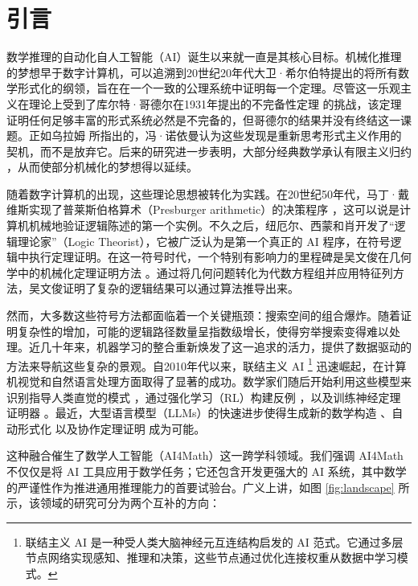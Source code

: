 \documentclass[11pt]{article}
\numberwithin{equation}{section}
\begin{document}
\section{引言}

数学推理的自动化自人工智能（AI）诞生以来就一直是其核心目标。机械化推理的梦想早于数字计算机，可以追溯到20世纪20年代大卫·希尔伯特提出的将所有数学形式化的纲领，旨在在一个一致的公理系统中证明每一个定理。尽管这一乐观主义在理论上受到了库尔特·哥德尔在1931年提出的不完备性定理 \cite{godel1931formally} 的挑战，该定理证明任何足够丰富的形式系统必然是不完备的，但哥德尔的结果并没有终结这一课题。正如乌拉姆 \cite{bams/1183522369} 所指出的，冯·诺依曼认为这些发现是重新思考形式主义作用的契机，而不是放弃它。后来的研究进一步表明，大部分经典数学承认有限主义归约 \cite{simpson1988partial}，从而使部分机械化的梦想得以延续。

随着数字计算机的出现，这些理论思想被转化为实践。在20世纪50年代，马丁·戴维斯实现了普莱斯伯格算术（Presburger arithmetic）的决策程序 \cite{Clarke_1966,Davis1983ThePA}，这可以说是计算机机械地验证逻辑陈述的第一个实例。不久之后，纽厄尔、西蒙和肖开发了“逻辑理论家”（Logic Theorist）\cite{1056797}，它被广泛认为是第一个真正的 AI 程序，在符号逻辑中执行定理证明。在这一符号时代，一个特别有影响力的里程碑是吴文俊在几何学中的机械化定理证明方法 \cite{wen1986basic,wu2012mechanical}。通过将几何问题转化为代数方程组并应用特征列方法，吴文俊证明了复杂的逻辑结果可以通过算法推导出来。

然而，大多数这些符号方法都面临着一个关键瓶颈：搜索空间的组合爆炸。随着证明复杂性的增加，可能的逻辑路径数量呈指数级增长，使得穷举搜索变得难以处理。近几十年来，机器学习的整合重新焕发了这一追求的活力，提供了数据驱动的方法来导航这些复杂的景观。自2010年代以来，联结主义 AI \footnote{联结主义 AI 是一种受人类大脑神经元互连结构启发的 AI 范式。它通过多层节点网络实现感知、推理和决策，这些节点通过优化连接权重从数据中学习模式。} 迅速崛起，在计算机视觉和自然语言处理方面取得了显著的成功。数学家们随后开始利用这些模型来识别指导人类直觉的模式 \cite{davies2021advancing,hashemi2025can,dong2024machine}，通过强化学习（RL）构建反例 \cite{wagner2021constructions,Gukov_2025,shehper2025what}，以及训练神经定理证明器 \cite{whalen2016holophrasm,bansal2019holist}。最近，大型语言模型（LLMs）的快速进步使得生成新的数学构造 \cite{romera2024mathematical, novikov2025alphaevolve,georgiev2025mathematical}、自动形式化 \cite{wu2022autoformalization,mathinc_gauss} 以及协作定理证明 \cite{zhou2025solving} 成为可能。

这种融合催生了数学人工智能（AI4Math）这一跨学科领域。我们强调 AI4Math 不仅仅是将 AI 工具应用于数学任务；它还包含开发更强大的 AI 系统，其中数学的严谨性作为推进通用推理能力的首要试验台。广义上讲，如图 \ref{fig:landscape} 所示，该领域的研究可分为两个互补的方向：
\end{document}
